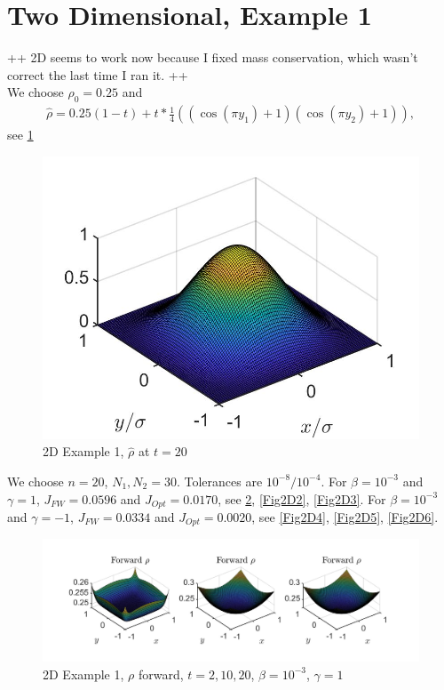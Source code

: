 \documentclass[11pt, a4paper]{article}
\theoremstyle{definition}
\begin{document}
\section{Two Dimensional, Example 1}
++ 2D seems to work now because I fixed mass conservation, which wasn't correct the last time I ran it. ++\\
We choose $\rho_0 = 0.25$ and
\begin{align*}
\hat \rho = 0.25(1-t) + t*\frac{1}{4}((\cos(\pi y_1)+1)(\cos(\pi y_2)+1)),  
\end{align*}
see \ref{rhoHat2d1}
\begin{figure}[h]
	\includegraphics[scale=0.3]{rhoHat2D1.jpg}
	\caption{2D Example 1, $\hat \rho$ at $t=20$}
	\label{rhoHat2d1}
\end{figure}
We choose $n = 20$, $N_1,N_2 = 30$. Tolerances are $10^{-8}/10^{-4}$.
For $\beta = 10^{-3}$ and $\gamma = 1$, $J_{FW} = 0.0596$ and $J_{Opt} = 0.0170$, see \ref{Fig2D1}, \ref{Fig2D2}, \ref{Fig2D3}.
For $\beta = 10^{-3}$ and $\gamma = -1$, $J_{FW} = 0.0334$ and $J_{Opt} = 0.0020$, see \ref{Fig2D4}, \ref{Fig2D5}, \ref{Fig2D6}.
\begin{figure}[h]
	\includegraphics[scale=0.3]{FWrho2Dg1.jpg}
	\caption{2D Example 1, $\rho$ forward, $t= 2,10,20$, $\beta = 10^{-3}$, $\gamma = 1$}
	\label{Fig2D1}
\end{figure}
\end{document}
